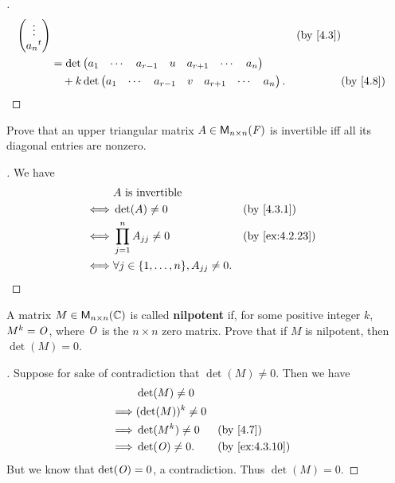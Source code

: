 \begin{proof}[]
\begin{align*}
\begin{pmatrix}
                                            \vdots         \\
                                            \tp{a_n}
                                          \end{pmatrix}                         &  & \text{(by \cref{4.3})} \\
            & = \det\begin{pmatrix}
                      a_1 & \cdots & a_{r - 1} & u & a_{r + 1} & \cdots & a_n
                    \end{pmatrix}                                 \\
            & \quad + k \det\begin{pmatrix}
                              a_1 & \cdots & a_{r - 1} & v & a_{r + 1} & \cdots & a_n
                            \end{pmatrix}.      &  & \text{(by \cref{4.8})}
  \end{align*}
\end{proof}

\begin{ex}\label{ex:4.3.9}
  Prove that an upper triangular matrix \(A \in \mathsf{M}_{{n} \times n}({\mathit{F}})\) is invertible iff all its diagonal entries are nonzero.
\end{ex}

\begin{proof}[]
  We have
  \begin{align*}
         & A \text{ is invertible}                                                            \\
    \iff & \det(A) \neq 0                                   &  & \text{(by \cref{4.3.1})}     \\
    \iff & \prod_{j = 1}^n A_{j j} \neq 0                   &  & \text{(by \cref{ex:4.2.23})} \\
    \iff & \forall j \in \set{1, \dots, n}, A_{j j} \neq 0.
  \end{align*}
\end{proof}

\begin{ex}\label{ex:4.3.10}
  A matrix \(M \in \mathsf{M}_{{n} \times n}({\mathbb{C}})\) is called \textbf{nilpotent} if, for some positive integer \(k\), \(M^k = \mathit{O}\), where \(\mathit{O}\) is the \(n \times n\) zero matrix.
  Prove that if \(M\) is nilpotent, then \(\det(M) = 0\).
\end{ex}

\begin{proof}[]
  Suppose for sake of contradiction that \(\det(M) \neq 0\).
  Then we have
  \begin{align*}
             & \det(M) \neq 0                                       \\
    \implies & (\det(M))^k \neq 0                                   \\
    \implies & \det(M^k) \neq 0   &  & \text{(by \cref{4.7})}       \\
    \implies & \det(\zm) \neq 0.  &  & \text{(by \cref{ex:4.3.10})}
  \end{align*}
  But we know that \(\det(\mathit{O}) = 0\), a contradiction.
  Thus \(\det(M) = 0\).
\end{proof}

